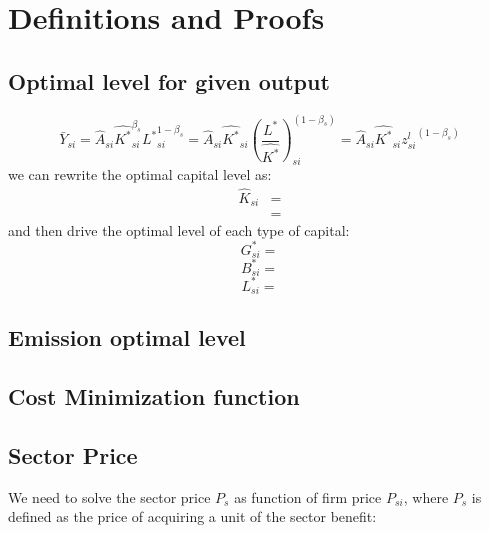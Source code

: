 \documentclass[12pt]{article} %
\begin{document}
\newpage

\appendix
\section{Definitions and Proofs} 
\subsection{Optimal level for given output} \label{Ap:optimal level for given output}
\begin{equation*}
    \bar{Y}_{si} = \hat{A}_{si} \hat{K^*}_{si}^{\beta_s} {L^*}_{si}^{1-\beta_s} = \hat{A}_{si} \hat{K^*}_{si} ({\frac{L^*}{\hat{K^*}}})_{si}^{(1-\beta_s)}= \hat{A}_{si} \hat{K^*}_{si} {z_{si}^l}^{(1-\beta_s)}
\end{equation*}
we can rewrite the optimal capital level as:
\begin{equation*}
    \begin{split}
        \hat{K}_{si} &= \\
        & = 
    \end{split}
\end{equation*}
and then drive the optimal level of each type of capital:
\begin{equation*}
    G_{si}^* = 
\end{equation*}
\begin{equation*}
    B_{si}^* = 
\end{equation*}
\begin{equation*}
    L_{si}^* = 
\end{equation*}

\subsection{Emission optimal level} \label{Ap:emission optimal level}


\subsection{Cost Minimization function} \label{Ap:cost minimization function}


\subsection{Sector Price} \label{Ap:sector price}
 We need to solve the sector price $P_s$ as function of firm price $P_{si}$, where $P_s$ is defined as the price of acquiring a unit of the sector benefit:
    
\end{document}
